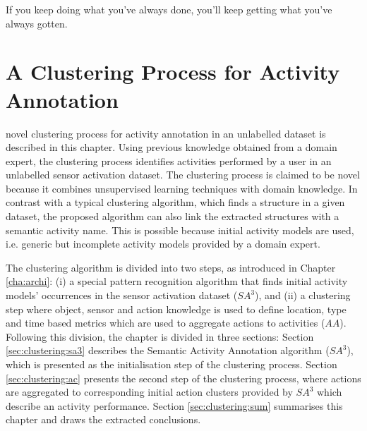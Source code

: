 

\begin{savequote}[50mm]
If you keep doing what you've always done, you'll keep getting what you've always gotten.
\end{savequote}


\chapter{A Clustering Process for Activity Annotation}
\label{cha:clustering}

\ifpdf
    \graphicspath{{4_clustering_process/figures/PDF/}{4_clustering_process/figures/PNG/}{4_clustering_process/figures/}}
\else
    \graphicspath{{4_clustering_process/figures/EPS/}{4_clustering_process/figures/}}
\fi

 novel clustering process for activity annotation in an unlabelled dataset is described in this chapter. Using previous knowledge obtained from a domain expert, the clustering process identifies activities performed by a user in an unlabelled sensor activation dataset. The clustering process is claimed to be novel because it combines unsupervised learning techniques with domain knowledge. In contrast with a typical clustering algorithm, which finds a structure in a given dataset, the proposed algorithm can also link the extracted structures with a semantic activity name. This is possible because initial activity models are used, i.e. generic but incomplete activity models provided by a domain expert. 

The clustering algorithm is divided into two steps, as introduced in Chapter \ref{cha:archi}: (i) a special pattern recognition algorithm that finds initial activity models' occurrences in the sensor activation dataset ($SA^3$), and (ii) a clustering step where object, sensor and action knowledge is used to define location, type and time based metrics which are used to aggregate actions to activities ($AA$). Following this division, the chapter is divided in three sections: Section \ref{sec:clustering:sa3} describes the Semantic Activity Annotation algorithm ($SA^3$), which is presented as the initialisation step of the clustering process. Section \ref{sec:clustering:ac} presents the second step of the clustering process, where actions are aggregated to corresponding initial action clusters provided by $SA^3$ which describe an activity performance. Section \ref{sec:clustering:sum} summarises this chapter and draws the extracted conclusions.

